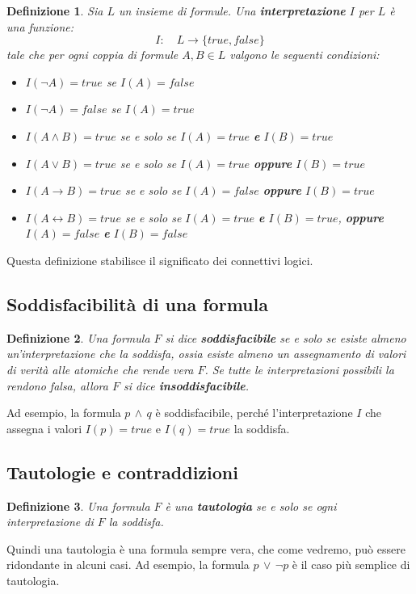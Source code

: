 \documentclass[a4paper,12pt]{report}
\newcommand{\tto} {\leftrightarrow}
\newtheorem{definition}{Definizione}[section]
\begin{document}
\begin{definition}
    Sia $L$ un insieme di formule. Una \textbf{interpretazione} $I$ per $L$ è una funzione:
    \[
        I: \quad L \to \{true, false\}
    \]
    tale che per ogni coppia di formule $A, B \in L$ valgono le seguenti condizioni:
    \begin{itemize}
        \item $I(\lnot A) = true$ se $I(A) = false$
        \item $I(\lnot A) = false$ se $I(A) = true$
        \item $I(A \land B) = true$ se e solo se $I(A) = true$ \textbf{e} $I(B) = true$
        \item $I(A \lor B) = true$ se e solo se $I(A) = true$ \textbf{oppure} $I(B) = true$
        \item $I(A \to B) = true$ se e solo se $I(A) = false$ \textbf{oppure} $I(B) = true$
        \item $I(A \tto B) = true$ se e solo se $I(A) = true$ \textbf{e} $I(B) = true$, \textbf{oppure} $I(A) = false$ \textbf{e} $I(B) = false$
    \end{itemize}
\end{definition}
Questa definizione stabilisce il significato dei connettivi logici.

\subsection{Soddisfacibilità di una formula}
\begin{definition}
    Una formula $F$ si dice \textbf{soddisfacibile} se e solo se esiste almeno un'interpretazione che la soddisfa, ossia esiste almeno un assegnamento di valori di verità alle atomiche che rende vera $F$. Se tutte le interpretazioni possibili la rendono falsa, allora $F$ si dice \textbf{insoddisfacibile}.
\end{definition}
Ad esempio, la formula $p \, \land \, q$ è soddisfacibile, perché l'interpretazione $I$ che assegna i valori $I(p) = true$ e $I(q) = true$ la soddisfa.

\subsection{Tautologie e contraddizioni}
\label{taut-contr}
\begin{definition}
    Una formula $F$ è una \textbf{tautologia} se e solo se ogni interpretazione di $F$ la soddisfa.
\end{definition}
Quindi una tautologia è una formula sempre vera, che come vedremo, può essere ridondante in alcuni casi. Ad esempio, la formula $p \, \lor \, \lnot p$ è il caso più semplice di tautologia.
\end{document}

